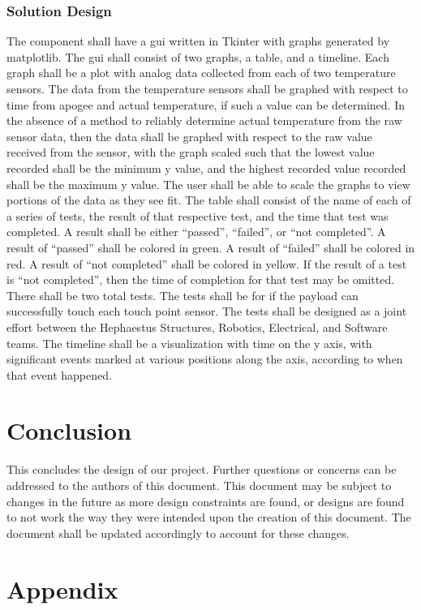 \documentclass[letterpaper,10pt]{article}
\begin{document}
\subsubsection{Solution Design}
The component shall have a \gls{gui} written in Tkinter with graphs generated by
\gls{matplotlib}.
The \gls{gui} shall consist of two graphs, a table, and a timeline.
Each graph shall be a \gls{plot} with analog data collected from each of two temperature sensors.
The data from the temperature sensors shall be graphed with respect to time from
\gls{apogee} and actual temperature, if such a value can be determined.
In the absence of a method to reliably determine actual temperature from the raw
sensor data, then the data shall be graphed with respect to the raw value received
from the sensor, with the graph scaled such that the lowest value recorded shall be
the minimum y value, and the highest recorded value recorded shall be the maximum y value.
The user shall be able to scale the graphs to view portions of the data as they see fit.
The table shall consist of the name of each of a series of tests,
the result of that respective test, and the time that test was completed.
A result shall be either ``passed'', ``failed'', or ``not completed''.
A result of ``passed'' shall be colored in green.
A result of ``failed'' shall be colored in red.
A result of ``not completed'' shall be colored in yellow.
If the result of a test is ``not completed'', then the time of completion for that test
may be omitted.
There shall be two total tests.
The tests shall be for if the \gls{payload} can successfully touch each touch point sensor.
The tests shall be designed as a joint effort between the Hephaestus Structures,
Robotics, Electrical, and Software teams.
The timeline shall be a visualization with time on the y axis, with significant events
marked at various positions along the axis, according to when that event happened.


\section{Conclusion}
This concludes the design of our project. Further questions or concerns can be addressed to the authors of this document.
This document may be subject to changes in the future as more design constraints are found, or designs are found to not work the way
they were intended upon the creation of this document. The document shall be updated accordingly to account for these changes.

\clearpage
\printglossary[numberedsection]

\section{Appendix}

\end{document}
